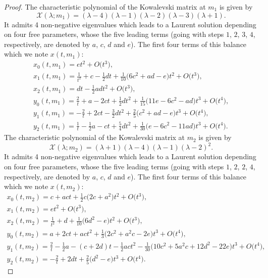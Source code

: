 \documentclass[10pt,a4paper]{amsart}
\numberwithin{equation}{section}
\begin{document}
\begin{proof}
The characteristic polynomial of the Kowalevski matrix at $m_1$
 is given by
 \[\mathcal{X}( \lambda;m_1)= ( \lambda-4 ) ( \lambda-1 ) (
 \lambda-2 )( \lambda-3 )( \lambda+1 ).
\]
It admits 4 non-negative eigenvalues which leads
to a Laurent solution depending on four free parameters, whose the
five leading terms (going with steps $1$, $2$, $3$, $4$, respectively, are
denoted by $a$, $c$, $d$ and $e$). The first four terms of this balance
which we note $x(t,m_1)$:
\begin{gather}
 x_0(t,m_1) = et^2 +O\bigl(t^3\bigr), \nonumber\\
 x_1(t,m_1) = \frac{1}{t^2}+c-\frac{1}{2}d t+\frac{1}{10}\bigl( 6c^2+ad-e\bigr)t^2+O\bigl(t^3\bigr), \nonumber\\
 x_2(t,m_1) = dt-\frac{1}{2}a d t^2+O\bigl(t^3\bigr), \nonumber\\
 y_0(t,m_1) = \frac{2}{t}+a-2ct+\frac{1}{2}d t^2+\frac{1}{15} \bigl(11e-6c^2-ad\bigr)t^3+O\bigl(t^4\bigr), \nonumber\\
 y_1(t,m_1) = -\frac{2}{t}+2ct-\frac{3}{2}d t^2+\frac{2}{5} \bigl(c^2+ad-e\bigr)t^3+O\bigl(t^4\bigr), \nonumber\\
 y_2(t,m_1) = \frac{1}{t}-\frac{1}{2}a-c t+\frac{5}{4}dt^2+\frac{ 1}{30}\bigl(e-6c^2-11ad\bigr)t^3+O\bigl(t^4\bigr). \label{balancemainem1}
\end{gather}
The characteristic polynomial of the Kowalevski matrix at $m_2$
 is given by
 \[\mathcal{X}( \lambda;m_2)= ( \lambda+1 ) ( \lambda-4 ) ( \lambda-1) ( \lambda-2 ) ^{2}.
\]It admits 4 non-negative eigenvalues which leads
to a Laurent solution depending on four free parameters, whose the
five leading terms (going with steps $1$, $2$, $2$, $4$, respectively, are
denoted by $a$, $c$, $d$ and $e$). The first four terms of this balance
which we note $x(t,m_2)$:
\begin{gather}
 x_0(t,m_2) = c+act+\frac{1}{2}c\bigl(2c+a^2\bigr)t^2+O\bigl(t^3 \bigr), \nonumber\\
 x_1(t,m_2) = et^2+O\bigl(t^3\bigr), \nonumber\\
 x_2(t,m_2) = \frac{1}{t^2}+d+\frac{1}{10}\bigl(6d^2-e\bigr)t^2 +O\bigl(t^3\bigr), \nonumber\\
 y_0(t,m_2) = a+2ct+act^2+\frac{1}{3}\bigl(2c^2+a^2c-2e\bigr)t^3 +O\bigl(t^4\bigr), \nonumber\\
 y_1(t,m_2) = \frac{2}{t}-\frac{1}{2}a-(c+2d)t-\frac{1 }{2}act^2-\frac{1}{30}\bigl(10c^2+5a^2c+12d^2-22e\bigr)t^3+O\bigl(t^4\bigr), \label{balancemainem2}\\
 y_2(t,m_2) = -\frac{2}{t}+2dt+\frac{2}{5}\bigl(d^2-e\bigr)t^3+ O\bigl(t^4\bigr).
\tag*{\qed}
\end{gather}
\renewcommand{\qed}{}
\end{proof}
\end{document}
